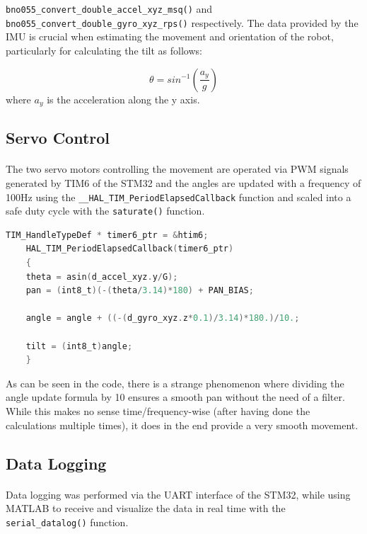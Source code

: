 \documentclass[english]{article}
\begin{document}
    \verb|bno055_convert_double_accel_xyz_msq()| and \verb|bno055_convert_double_gyro_xyz_rps()| respectively.  The data provided by the IMU is crucial when estimating the movement and orientation of the robot, particularly for calculating the tilt as follows:

    \begin{equation}
        \theta = sin^{-1}(\frac{a_y}{g})
    \end{equation}
    where $a_y$ is the acceleration along the y axis.

    \subsection{Servo Control}
    \paragraph{}
    The two servo motors controlling the movement are operated via PWM signals generated by TIM6 of the STM32 and the angles are updated with a frequency of 100Hz using the \verb|__HAL_TIM_PeriodElapsedCallback| function and scaled into a safe duty cycle with the \verb|saturate()| function. 
    \begin{lstlisting}[language=C, caption={Angle update function}, label={lst.lab1.line} ]
    TIM_HandleTypeDef * timer6_ptr = &htim6;
    HAL_TIM_PeriodElapsedCallback(timer6_ptr)
    {
    theta = asin(d_accel_xyz.y/G); 
    pan = (int8_t)(-(theta/3.14)*180) + PAN_BIAS;

    angle = angle + ((-(d_gyro_xyz.z*0.1)/3.14)*180.)/10.;

    tilt = (int8_t)angle;
    }
    \end{lstlisting}
    As can be seen in the code, there is a strange phenomenon where dividing the angle update formula by 10 ensures a smooth pan without the need of a filter. While this makes no sense time/frequency-wise (after having done the calculations multiple times), it does in the end provide a very smooth movement.

    \subsection{Data Logging}
    \paragraph{}
    Data logging was performed via the UART interface of the STM32, while using MATLAB to receive and visualize the data in real time with the \verb|serial_datalog()| function. %
\end{document}
